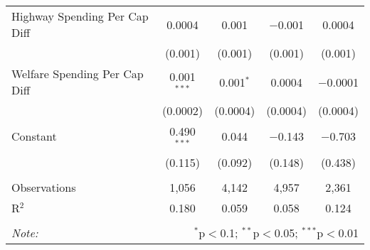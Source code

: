\begin{table}[!htbp]
\begin{tabular}{@{\extracolsep{5pt}}lcccc}
  Highway Spending Per Cap Diff & 0.0004 & 0.001 & $-$0.001 & 0.0004 \\ 
  & (0.001) & (0.001) & (0.001) & (0.001) \\ 
  Welfare Spending Per Cap Diff & 0.001$^{***}$ & 0.001$^{*}$ & 0.0004 & $-$0.0001 \\ 
  & (0.0002) & (0.0004) & (0.0004) & (0.0004) \\ 
  Constant & 0.490$^{***}$ & 0.044 & $-$0.143 & $-$0.703 \\ 
  & (0.115) & (0.092) & (0.148) & (0.438) \\ 
 \hline \\[-1.8ex] 
Observations & 1,056 & 4,142 & 4,957 & 2,361 \\ 
R$^{2}$ & 0.180 & 0.059 & 0.058 & 0.124 \\ 
\hline 
\hline \\[-1.8ex] 
\textit{Note:}  & \multicolumn{4}{r}{$^{*}$p$<$0.1; $^{**}$p$<$0.05; $^{***}$p$<$0.01} \\ 
\end{tabular} 
\end{table} 
